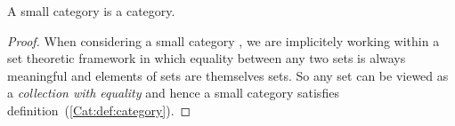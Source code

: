\begin{prop}\label{Cat:prop:smallcat:is:cat}
    A small category is a category.
\end{prop}
\begin{proof}
    When considering a small category \Cat, we are implicitely working
    within a set theoretic framework in which equality between any two
    sets is always meaningful and elements of sets are themselves sets.
    So any set can be viewed as a {\em collection with equality} and 
    hence a small category satisfies definition~(\ref{Cat:def:category}).
\end{proof}
